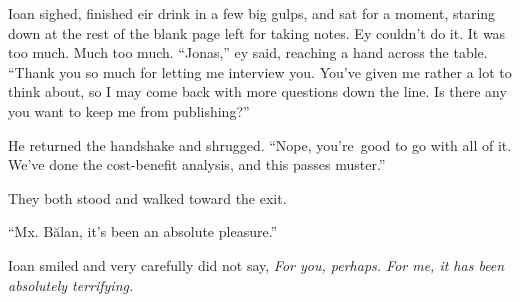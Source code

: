 Ioan sighed, finished eir drink in a few big gulps, and sat for a moment, staring down at the rest of the blank page left for taking notes. Ey couldn't do it. It was too much. Much too much. ``Jonas,'' ey said, reaching a hand across the table. ``Thank you so much for letting me interview you. You've given me rather a lot to think about, so I may come back with more questions down the line. Is there any you want to keep me from publishing?''

He returned the handshake and shrugged. ``Nope, you're\pagebreak\ good to go with all of it. We've done the cost-benefit analysis, and this passes muster.''

They both stood and walked toward the exit.

``Mx. Bălan, it's been an absolute pleasure.''

Ioan smiled and very carefully did not say, \emph{For you, perhaps. For me, it has been absolutely terrifying.}
